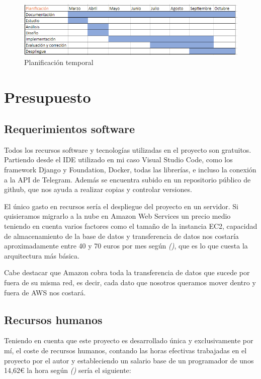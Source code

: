 \begin{figure}[!ht]
    \centering
    \includegraphics[width=1\textwidth]{imagenes/plan.png}
    \caption{ Planificación temporal }
    \label{fig:planificacion}
\end{figure}
\vspace{1cm}

\section{Presupuesto}

\subsection{Requerimientos software}

Todos los recursos software y tecnologías utilizadas en el proyecto son gratuitos. Partiendo desde el IDE utilizado en mi caso Visual Studio Code, como los framework Django y Foundation, Docker, todas las librerías, e incluso la conexión a la API de Telegram. Además se encuentra subido en un repositorio público de github, que nos ayuda a realizar copias y controlar versiones. 

El único gasto en recursos sería el despliegue del proyecto en un servidor. Si quisieramos migrarlo a la nube en Amazon Web Services un precio medio teniendo en cuenta varios factores como el tamaño de la instancia EC2, capacidad de almacenamiento de la base de datos y transferencia de datos nos costaría aproximadamente entre 40 y 70 euros por mes según \textit{(\cite{aws2022})}, que es lo que cuesta la arquitectura más básica. 

Cabe destacar que Amazon cobra toda la transferencia de datos que sucede por fuera de su misma red, es decir, cada dato que nosotros queramos mover dentro y fuera de AWS nos costará.


\subsection{Recursos humanos}


Teniendo en cuenta que este proyecto es desarrollado única y exclusivamente por mí, el coste de recursos humanos, contando las horas efectivas trabajadas en el proyecto por el autor y estableciendo un salario base de un programador de unos 14,62€ la hora según  \textit{(\cite{salario2022})} sería el siguiente:\vspace{0.5cm}


